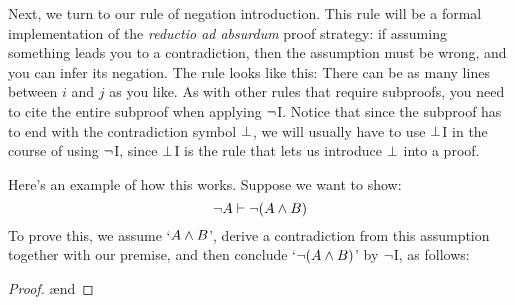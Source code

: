 

Next, we turn to our rule of negation introduction. This rule will be a formal implementation of the \emph{reductio ad absurdum} proof strategy: if assuming something leads you to a contradiction, then the assumption must be wrong, and you can infer its negation. The rule looks like this:
There can be as many lines between $i$ and $j$ as you like.  As with other rules that require subproofs, you need to cite the entire subproof when applying $\neg$I.  Notice that since the subproof has to end with the contradiction symbol $\bot$, we will usually have to use $\bot$I in the course of using $\neg$I, since $\bot$I is the rule that lets us introduce $\bot$ into a proof.


Here's an example of how this works.  Suppose we want to show:
$$\neg A \vdash \neg(A \wedge B)$$
To prove this, we assume `$A \wedge B$', derive a contradiction from this assumption together with our premise, and then conclude `$\neg (A \wedge B)$' by $\neg$I, as follows:
\begin{proof}
	 
	\open
	 
	\ae{nd}
	\close
\end{proof}


